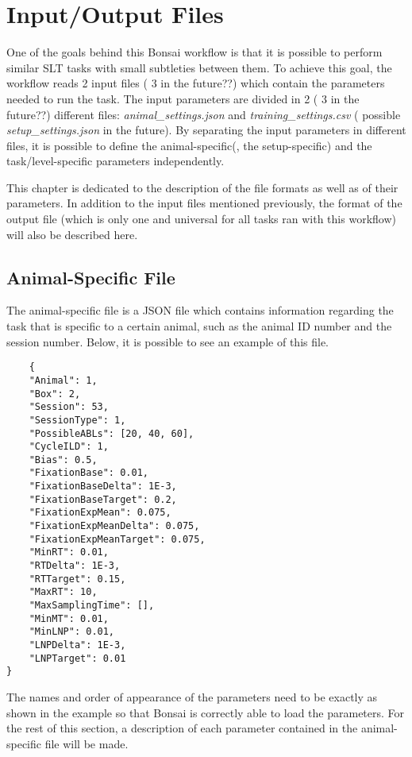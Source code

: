 \chapter{Input/Output Files}
\label{chap:io_files}

One of the goals behind this Bonsai workflow is that it is possible to perform similar SLT tasks with small subtleties between them. To achieve this goal, the workflow reads 2 input files ({\color{red} 3 in the future??}) which contain the parameters needed to run the task. The input parameters are divided in 2 ({\color{red} 3 in the future??}) different files: \textit{animal\_settings.json} and \textit{training\_settings.csv} ({\color{red} possible \textit{setup\_settings.json} in the future}). By separating the input parameters in different files, it is possible to define the animal-specific({\color{red}, the setup-specific}) and the task/level-specific parameters independently.

This chapter is dedicated to the description of the file formats as well as of their parameters. In addition to the input files mentioned previously, the format of the output file (which is only one and universal for all tasks ran with this workflow) will also be described here.

\section{Animal-Specific File}
\label{sec:animal_specific}
The animal-specific file is a JSON file which contains information regarding the task that is specific to a certain animal, such as the animal ID number and the session number. Below, it is possible to see an example of this file.
\begin{verbatim}
    {
    "Animal": 1,
    "Box": 2,
    "Session": 53,
    "SessionType": 1,
    "PossibleABLs": [20, 40, 60],
    "CycleILD": 1,
    "Bias": 0.5,
    "FixationBase": 0.01,
    "FixationBaseDelta": 1E-3,
    "FixationBaseTarget": 0.2,
    "FixationExpMean": 0.075,
    "FixationExpMeanDelta": 0.075,
    "FixationExpMeanTarget": 0.075,
    "MinRT": 0.01,
    "RTDelta": 1E-3,
    "RTTarget": 0.15,
    "MaxRT": 10,
    "MaxSamplingTime": [],
    "MinMT": 0.01,
    "MinLNP": 0.01,
    "LNPDelta": 1E-3,
    "LNPTarget": 0.01
}
\end{verbatim}  

The names and order of appearance of the parameters need to be exactly as shown in the example so that Bonsai is correctly able to load the parameters. For the rest of this section, a description of each parameter contained in the animal-specific file will be made.

